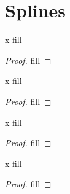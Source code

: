 \section{Splines}

\begin{exercise}{x}
fill
\end{exercise}
\begin{proof}
fill
\end{proof} 

\begin{exercise}{x}
fill
\end{exercise}
\begin{proof}
fill
\end{proof} 

\begin{exercise}{x}
fill
\end{exercise}
\begin{proof}
fill
\end{proof} 

\begin{exercise}{x}
fill
\end{exercise}
\begin{proof}
fill
\end{proof} 
